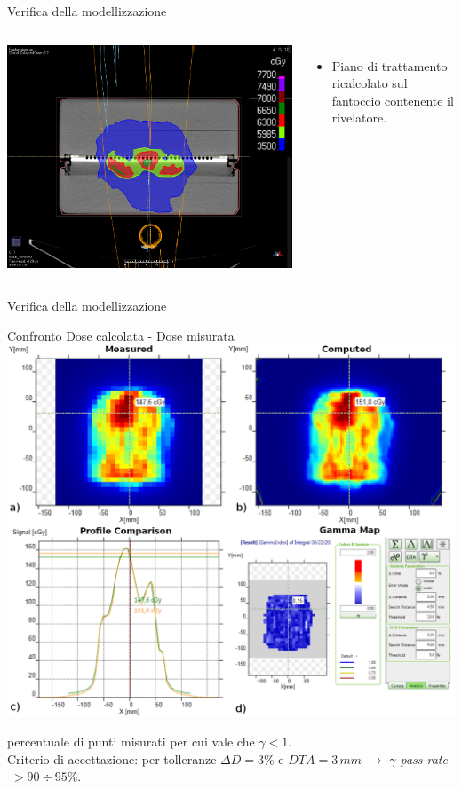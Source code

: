 \documentclass{beamer}
\begin{document}
\begin{frame}{Verifica della modellizzazione}
\begin{columns}
\centering
\includegraphics[width=.8\textwidth]{./img/Pzt_Matrixx.png}
\begin{itemize}
\tiny
\item Piano di trattamento ricalcolato sul fantoccio contenente il rivelatore.
\end{itemize}
\end{columns}
\end{frame}

\begin{frame}[t]{Verifica della modellizzazione}
\vspace{-.5cm}
\begin{center}
\footnotesize
\alert{Confronto Dose calcolata - Dose misurata}\\ \vspace{.2cm}
\includegraphics[width=.8\textwidth]{../cap2/gamma_comparison.png}
\end{center}
\vspace{-.25cm}
\scriptsize
{} percentuale di punti misurati per cui vale che $\gamma < 1$.\\ \vspace{.2cm}
{\color{Dgreen} Criterio di accettazione:} per tolleranze $\Delta D = 3\%$ e $DTA = 3\,mm$ $\rightarrow$ $\gamma$\textit{-pass rate}$\; >90\div 95\%$.
\end{frame}
\end{document}
